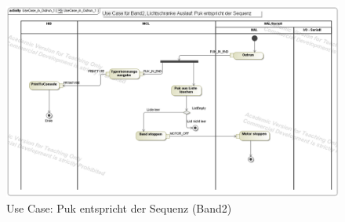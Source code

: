 \documentclass[
   draft=false
  ,paper=a4
  ,twoside=true
  ,fontsize=11pt
  ,headsepline
  ,DIV11
  ,parskip=full+
]{scrartcl} %
\begin{document}
\begin{figure}[H]
\begin{addmargin*}[-2.2cm]{-0.1\textwidth}
  	\centering
    \includegraphics [width=1.3\textwidth]{./IMG/UseCaseInOutrun3.png}
    \caption[short Name]{Use Case: Puk entspricht der Sequenz (Band2)}
    	\label{fig:uc3slide}
\end{addmargin*}
\end{figure}

\end{document}
